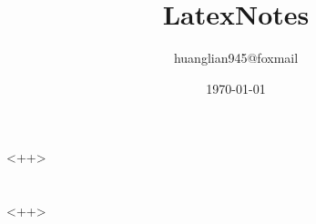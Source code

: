 \documentclass{book}
\begin{document}
\title{LatexNotes}
\author{huanglian945@foxmail}
\date{\today}
\maketitle

\tableofcontents
\setcounter{tocdepth}{3}

\chapter*{}<++>
\chapter*{}<++>

\end{document}
